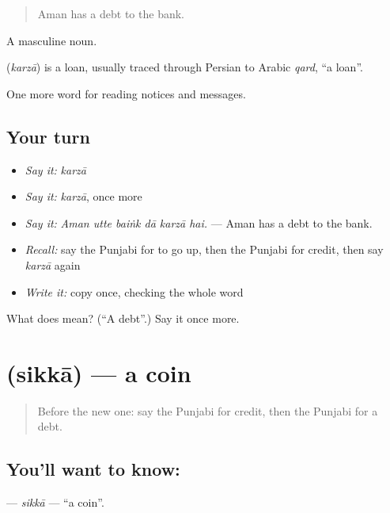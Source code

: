 \begin{quote}
Aman has a debt to the bank.
\end{quote}

A masculine noun.

\begin{cousinweb}
\textbf{} (\emph{karzā}) is a loan, usually traced through Persian to Arabic \emph{qard}, \textquotedblleft{}a loan\textquotedblright{}.
\end{cousinweb}

\begin{grammarlens}[title={What you've built}]
One more word for reading notices and messages.
\end{grammarlens}

\subsection*{Your turn}
\begin{itemize}
\raggedright
  \item \emph{Say it:} \emph{karzā}
  \item \emph{Say it:} \emph{karzā}, once more
  \item \emph{Say it:} \emph{Aman utte baiṅk dā karzā hai.} — Aman has a debt to the bank.
  \item \emph{Recall:} say the Punjabi for to go up, then the Punjabi for credit, then say \emph{karzā} again
  \item \emph{Write it:} copy \textbf{} once, checking the whole word
\end{itemize}

\begin{tcolorbox}[breakable,colback=teal!4,colframe=teal!35!black,title={Before you move on}]
What does  mean? (\textquotedblleft{}A debt\textquotedblright{}.) Say it once more.
\end{tcolorbox}
\section[\texorpdfstring{\pa{ਸਿੱਕਾ} (sikkā)}{ਸਿੱਕਾ (sikkā)}]{ (sikkā) — a coin}

\label{lesson:PA-C258-sikka}



\begin{quote}
Before the new one: say the Punjabi for credit, then the Punjabi for a debt.
\end{quote}

\subsection*{You'll want to know: }
\textbf{} — \emph{sikkā} — \textquotedblleft{}a coin\textquotedblright{}.

